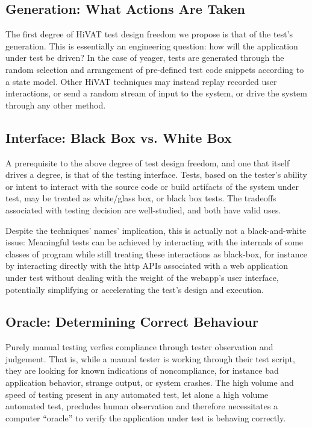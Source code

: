 \subsection{Generation: What Actions Are Taken}
The first degree of HiVAT test design freedom we propose is that of the test's generation. This is essentially an engineering question: how will the application under test be driven? In the case of yeager, tests are generated through the random selection and arrangement of pre-defined test code snippets according to a state model. Other HiVAT techniques may instead replay recorded user interactions, or send a random stream of input to the system, or drive the system through any other method.

\subsection{Interface: Black Box vs. White Box}
A prerequisite to the above degree of test design freedom, and one that itself drives a degree, is that of the testing interface. Tests, based on the tester's ability or intent to interact with the source code or build artifacts of the system under test, may be treated as white/glass box, or black box tests. The tradeoffs associated with testing decision are well-studied, and both have valid uses.

Despite the techniques' names' implication, this is actually not a black-and-white issue: Meaningful tests can be achieved by interacting with the internals of some classes of program while still treating these interactions as black-box, for instance by interacting directly with the http APIs associated with a web application under test without dealing with the weight of the webapp's user interface, potentially simplifying or accelerating the test's design and execution.\citep{HoffmanTradeoffs}

\subsection{Oracle: Determining Correct Behaviour}
Purely manual testing verfies compliance through tester observation and judgement. That is, while a manual tester is working through their test script, they are looking for known indications of noncompliance, for instance bad application behavior, strange output, or system crashes. The high volume and speed of testing present in any automated test, let alone a high volume automated test, precludes human observation and therefore necessitates a computer ``oracle'' to verify the application under test is behaving correctly.

